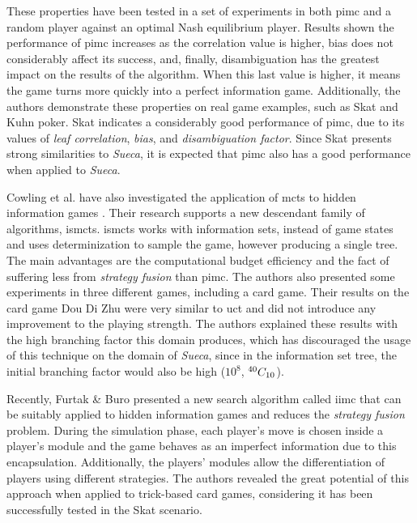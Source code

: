 These properties have been tested in a set of experiments in both \ac{pimc} and a random player against an optimal Nash equilibrium player.
Results shown the performance of \ac{pimc} increases as the correlation value is higher, bias does not considerably affect its success, and, finally, disambiguation has the greatest impact on the results of the algorithm.
When this last value is higher, it means the game turns more quickly into a perfect information game.
Additionally, the authors demonstrate these properties on real game examples, such as Skat and Kuhn poker.
Skat indicates a considerably good performance of \ac{pimc}, due to its values of \emph{leaf correlation}, \emph{bias}, and \emph{disambiguation factor}.
Since Skat presents strong similarities to \emph{Sueca}, it is expected that \ac{pimc} also has a good performance when applied to \emph{Sueca}.


Cowling et al. have also investigated the application of \ac{mcts} to hidden information games \cite{Cowling2012}.
Their research supports a new descendant family of algorithms, \ac{ismcts}.
\ac{ismcts} works with information sets, instead of game states and uses determinization to sample the game, however producing a single tree.
The main advantages are the computational budget efficiency and the fact of suffering less from \emph{strategy fusion} than \ac{pimc}.
The authors also presented some experiments in three different games, including a card game.
Their results on the card game Dou Di Zhu were very similar to \ac{uct} and did not introduce any improvement to the playing strength.
The authors explained these results with the high branching factor this domain produces, which has discouraged the usage of this technique on the domain of \emph{Sueca}, since in the information set tree, the initial branching factor would also be high ($10^{8}$, ${}^{40}C_{10}$).


Recently, Furtak \& Buro \cite{Furtak} presented a new search algorithm called \ac{iimc} that can be suitably applied to hidden information games and reduces the \emph{strategy fusion} problem.
During the simulation phase, each player's move is chosen inside a player's module and the game behaves as an imperfect information due to this encapsulation.
Additionally, the players' modules allow the differentiation of players using different strategies.
The authors revealed the great potential of this approach when applied to trick-based card games, considering it has been successfully tested in the Skat scenario.


